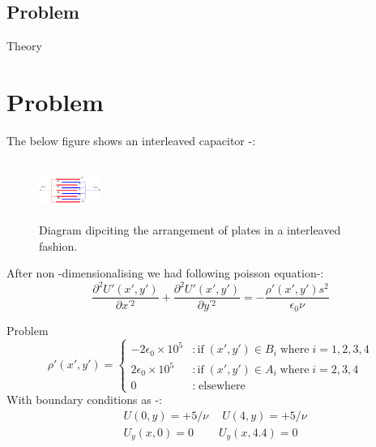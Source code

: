 \documentclass[8pt]{beamer}
\begin{document}
	\subsection{Problem}
	\begin{frame}{Theory}
		\section{Problem}
		The below figure shows an interleaved capacitor -:
			\begin{figure}[h]
			\centering
			\includegraphics[width=2cm, height=1.9cm]{insert.png}
			\caption{\small Diagram dipciting the arrangement of plates in a interleaved fashion.}
			\label{fig 1: the capacitor}

			\end{figure}
			After non -dimensionalising we had following poisson equation-:
			$$ \frac{\partial^2U'(x',y') }{\partial x^{'2}} + \frac{\partial^2U'(x',y') }{\partial y^{'2}}= -\frac{\rho'(x',y') s^2}{\epsilon_0 \nu} $$
			
		\end{frame}
	\begin{frame}{Problem}
		\begin{equation}
			\rho'(x',y') =  \begin{cases}
				-2\epsilon_0 \times 10^5  & :\text{if} \; (x',y') \in B_i \; \text{where} \; i = 1,2,3,4 \\
				2\epsilon_0 \times 10^5 & :\text{if} \; (x',y') \in A_i \; \text{where} \; i = 2,3,4 \\
				0  & : \; \text{elsewhere}
			\end{cases}
		\end{equation}
		With boundary conditions as -:
		\begin{align}
			& U(0,y) = +5/\nu \quad \ U(4,y) = +5/\nu \\ 
			& U_y(x,0) = 0 \qquad \ U_y(x,4.4) = 0 
		\end{align}
		
		\end{frame}	
\end{document}
